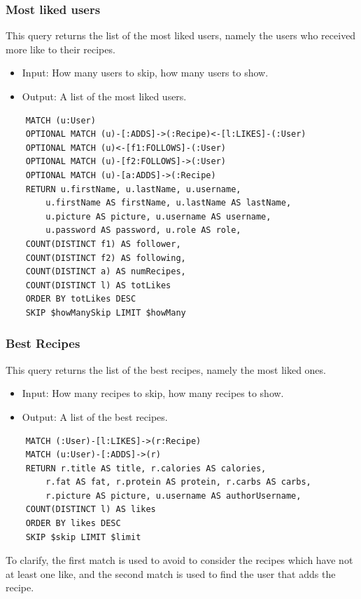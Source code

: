 \documentclass[a4paper]{report}
\begin{document}
\subsubsection{Most liked users}
This query returns the list of the most liked users, namely the users who received more like to their recipes.
\begin{itemize}
	\item Input: How many users to skip, how many users to show.
	\item Output: A list of the most liked users.
\end{itemize}
\lstset{ language=java}
\begin{lstlisting}
	MATCH (u:User)
	OPTIONAL MATCH (u)-[:ADDS]->(:Recipe)<-[l:LIKES]-(:User)
	OPTIONAL MATCH (u)<-[f1:FOLLOWS]-(:User)
	OPTIONAL MATCH (u)-[f2:FOLLOWS]->(:User) 
	OPTIONAL MATCH (u)-[a:ADDS]->(:Recipe)
	RETURN u.firstName, u.lastName, u.username, 
		u.firstName AS firstName, u.lastName AS lastName, 
		u.picture AS picture, u.username AS username, 
		u.password AS password, u.role AS role, 
	COUNT(DISTINCT f1) AS follower, 
	COUNT(DISTINCT f2) AS following, 
	COUNT(DISTINCT a) AS numRecipes, 
	COUNT(DISTINCT l) AS totLikes 
	ORDER BY totLikes DESC 
	SKIP $howManySkip LIMIT $howMany
\end{lstlisting}
\subsubsection{Best Recipes}
This query returns the list of the best recipes, namely the most liked ones.
\begin{itemize}
	\item Input: How many recipes to skip, how many recipes to show.
	\item Output: A list of the best recipes.
\end{itemize}
\lstset{ language=java}
\begin{lstlisting}
	MATCH (:User)-[l:LIKES]->(r:Recipe)
	MATCH (u:User)-[:ADDS]->(r)
	RETURN r.title AS title, r.calories AS calories,
		r.fat AS fat, r.protein AS protein, r.carbs AS carbs, 
		r.picture AS picture, u.username AS authorUsername,
	COUNT(DISTINCT l) AS likes 
	ORDER BY likes DESC
	SKIP $skip LIMIT $limit
\end{lstlisting}
To clarify, the first match is used to avoid to consider the recipes which have not at least one like, and the second match is used to find the user that adds the recipe.
\end{document}
